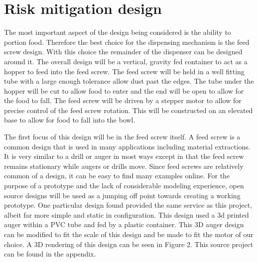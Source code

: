 \documentclass[12pt]{article}
\newcounter{engineering}
\begin{document}
\section{Risk mitigation design}
The most important aspect of the design being considered is the ability to portion food. Therefore the best choice for the dispensing mechanism is the feed screw design. With this choice the remainder of the dispenser can be designed around it. The overall design will be a vertical, gravity fed container to act as a hopper to feed into the feed screw. The feed screw will be held in a well fitting tube with a large enough tolerance allow dust past the edges. The tube under the hopper will be cut to allow food to enter and the end will be open to allow for the food to fall. The feed screw will be driven by a stepper motor to allow for precise control of the feed screw rotation. This will be constructed on an elevated base to allow for food to fall into the bowl.

The first focus of this design will be in the feed screw itself. A feed screw is a common design that is used in many applications including material extractions. It is very similar to a drill or auger in most ways except in that the feed screw remains stationary while augers or drills move. Since feed screws are relatively common of a design, it can be easy to find many examples online. For the purpose of a prototype and the lack of considerable modeling experience, open source designs will be used as a jumping off point towards creating a working prototype. One particular design found provided the same service as this project, albeit far more simple and static in configuration. This design used a 3d printed auger within a PVC tube and fed by a plastic container. This 3D auger design can be modified to fit the scale of this design and be made to fit the motor of our choice. A 3D rendering of this design can be seen in Figure 2. This source project can be found in the appendix. 
\end{document}
